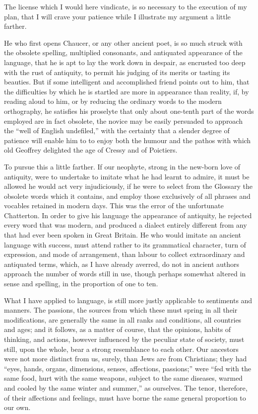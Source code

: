 The license which I would here vindicate, is so necessary to the
execution of my plan, that I will crave your patience while I illustrate
my argument a little farther.

He who first opens Chaucer, or any other ancient poet, is so much struck
with the obsolete spelling, multiplied consonants, and antiquated
appearance of the language, that he is apt to lay the work down in
despair, as encrusted too deep with the rust of antiquity, to permit his
judging of its merits or tasting its beauties. But if some intelligent
and accomplished friend points out to him, that the difficulties by
which he is startled are more in appearance than reality, if, by reading
aloud to him, or by reducing the ordinary words to the modern
orthography, he satisfies his proselyte that only about one-tenth part
of the words employed are in fact obsolete, the novice may be easily
persuaded to approach the ``well of English undefiled,'' with the
certainty that a slender degree of patience will enable him to to enjoy
both the humour and the pathos with which old Geoffrey delighted the age
of Cressy and of Poictiers.

To pursue this a little farther. If our neophyte, strong in the new-born
love of antiquity, were to undertake to imitate what he had learnt to
admire, it must be allowed he would act very injudiciously, if he were
to select from the Glossary the obsolete words which it contains, and
employ those exclusively of all phrases and vocables retained in modern
days. This was the error of the unfortunate Chatterton. In order to give
his language the appearance of antiquity, he rejected every word that
was modern, and produced a dialect entirely different from any that had
ever been spoken in Great Britain. He who would imitate an ancient
language with success, must attend rather to its grammatical character,
turn of expression, and mode of arrangement, than labour to collect
extraordinary and antiquated terms, which, as I have already averred, do
not in ancient authors approach the number of words still in use, though
perhaps somewhat altered in sense and spelling, in the proportion of one
to ten.

What I have applied to language, is still more justly applicable to
sentiments and manners. The passions, the sources from which these must
spring in all their modifications, are generally the same in all ranks
and conditions, all countries and ages; and it follows, as a matter of
course, that the opinions, habits of thinking, and actions, however
influenced by the peculiar state of society, must still, upon the whole,
bear a strong resemblance to each other. Our ancestors were not more
distinct from us, surely, than Jews are from Christians; they had
``eyes, hands, organs, dimensions, senses, affections, passions;'' were
``fed with the same food, hurt with the same weapons, subject to the
same diseases, warmed and cooled by the same winter and summer,'' as
ourselves. The tenor, therefore, of their affections and feelings, must
have borne the same general proportion to our own.

